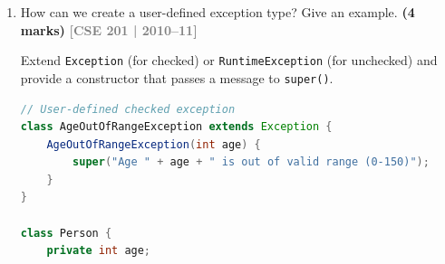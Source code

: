\documentclass[12pt,a3paper]{article}
\newcommand{\yr}[1]{\hfill\textcolor{gray}{\small\textbf{[#1]}}}
\newcommand{\mk}[1]{\textcolor{orange!70!black}{\small\textbf{(#1 marks)}}}
\begin{document}
\begin{enumerate}
\begin{tcolorbox}[enhanced,breakable,ansbox,
  colback=cE!4,colframe=cE,boxrule=0.8pt,arc=5pt,
  title={\textbf{Answer --- Catch or Declare Strategy}},
  fonttitle=\bfseries\color{white},colbacktitle=cE]
Java's \textbf{``catch or declare''} rule applies to \emph{checked}
exceptions: any method that may throw a checked exception must either
\textbf{(a) catch} it locally or \textbf{(b) declare} it with
\texttt{throws}.

\textbf{Option A --- Catch it (handle locally):}
\begin{lstlisting}[language=Java]
void readFile(String path) {
    try {
        FileReader fr = new FileReader(path);
        // ... use fr ...
    } catch (IOException e) {
        System.out.println("Handled: " + e.getMessage());
    }
}
\end{lstlisting}

\textbf{Option B --- Declare it (propagate to caller):}
\begin{lstlisting}[language=Java]
void readFile(String path) throws IOException {
    FileReader fr = new FileReader(path); // not caught here
    // ... use fr ...
}

// Caller must then catch or declare IOException
void caller() throws IOException {
    readFile("data.txt");
}
\end{lstlisting}

Unchecked exceptions (\texttt{RuntimeException} and its subclasses)
are \emph{exempt} from this rule --- they may be thrown without
declaration.
\end{tcolorbox}



\item How can we create a user-defined exception type? Give an example. \mk{4}
\yr{CSE 201 | 2010--11}

\begin{tcolorbox}[enhanced,breakable,ansbox,
  colback=cE!4,colframe=cE,boxrule=0.8pt,arc=5pt,
  title={\textbf{Answer --- Creating a User-Defined Exception}},
  fonttitle=\bfseries\color{white},colbacktitle=cE]

Extend \texttt{Exception} (for checked) or \texttt{RuntimeException}
(for unchecked) and provide a constructor that passes a message to
\texttt{super()}.

\begin{lstlisting}[language=Java]
// User-defined checked exception
class AgeOutOfRangeException extends Exception {
    AgeOutOfRangeException(int age) {
        super("Age " + age + " is out of valid range (0-150)");
    }
}

class Person {
    private int age;


\end{lstlisting}
\end{tcolorbox}
\end{enumerate}
\end{document}
